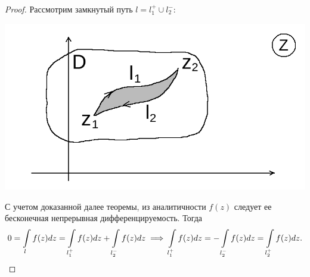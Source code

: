 \documentclass[../../main.tex]{subfiles}
\begin{document}
\begin{proof}
Рассмотрим замкнутый путь $ l = l_1^+ \cup
l_2^- $:
\begin{center}
\includegraphics[scale = 0.3]{lec31_3.png} 
\end{center}
С учетом доказанной далее теоремы, из аналитичности $f(z)$ следует ее
бесконечная непрерывная дифференцируемость. Тогда 
\[ 0 = \int\limits_{l} f(z) dz = \int\limits_{l_1^+} f(z) dz +
\int\limits_{l_2^-} f(z) dz 
 \implies \int\limits_{l_1^+} f(z) dz =
- \int\limits_{l_2^-} f(z) dz = \int\limits_{l_2^+} f(z) dz.\qedhere\]
\end{proof}
\end{document}
